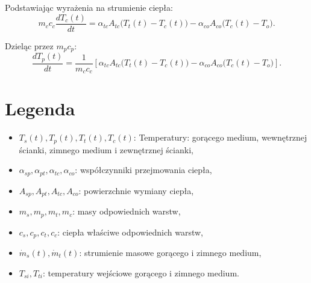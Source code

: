 \documentclass{article}
\begin{document}
	Podstawiając wyrażenia na strumienie ciepła:
	\[
	m_c c_c \frac{dT_c(t)}{dt} = \alpha_{tc} A_{tc} \big(T_t(t) - T_c(t)\big) - \alpha_{co} A_{co} \big(T_c(t) - T_o\big).
	\]
	
	Dzieląc przez \( m_p c_p \):
	\[
	\frac{dT_p(t)}{dt} = \frac{1}{m_c c_c} \left[ \alpha_{tc} A_{tc} \big(T_t(t) - T_c(t)\big) - \alpha_{co} A_{co} \big(T_c(t) - T_o\big) \right].
	\]
	
			
	\section*{Legenda}
	
	\begin{itemize}
		\item \( T_s(t), T_p(t), T_t(t), T_c(t) \): Temperatury: gorącego medium,  wewnętrznej ścianki, zimnego medium i zewnętrznej ścianki,
		\item \( \alpha_{sp}, \alpha_{pt},\alpha_{tc},\alpha_{co} \): współczynniki przejmowania ciepła,
		\item \( A_{sp}, A_{pt}, A_{tc}, A_{co} \): powierzchnie wymiany ciepła,
		\item \( m_s, m_p, m_t, m_c \): masy odpowiednich warstw,
		\item \( c_s, c_p, c_t, c_c \): ciepła właściwe odpowiednich warstw,
		\item \( \dot{m}_s(t), \dot{m}_t(t) \): strumienie masowe gorącego i zimnego medium,
		\item \( T_{si}, T_{ti} \): temperatury wejściowe gorącego i zimnego medium.
	\end{itemize}
\end{document}

